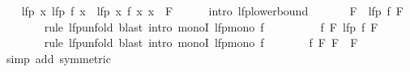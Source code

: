 \begin{isabellebody}
\ \ \isamarkupfalse%
\ {\isachardoublequoteopen}lfp\ {\isacharparenleft}{\kern0pt}{\isasymlambda}x{\isachardot}{\kern0pt}\ lfp\ {\isacharparenleft}{\kern0pt}f\ x{\isacharparenright}{\kern0pt}{\isacharparenright}{\kern0pt}\ {\isasymge}\ lfp\ {\isacharparenleft}{\kern0pt}{\isasymlambda}x{\isachardot}{\kern0pt}\ f\ x\ x{\isacharparenright}{\kern0pt}{\isachardoublequoteclose}\ {\isacharparenleft}{\kern0pt}\ {\isachardoublequoteopen}{\isacharquery}{\kern0pt}F\ {\isasymge}\ {\isacharunderscore}{\kern0pt}{\isachardoublequoteclose}{\isacharparenright}{\kern0pt}\isanewline
\ \ \isamarkupfalse%
\ {\isacharparenleft}{\kern0pt}intro\ lfp{\isacharunderscore}{\kern0pt}lowerbound{\isacharparenright}{\kern0pt}\isanewline
\ \ \ \ \isamarkupfalse%
\ {\isacharasterisk}{\kern0pt}{\isacharcolon}{\kern0pt}\ {\isachardoublequoteopen}{\isacharquery}{\kern0pt}F\ {\isacharequal}{\kern0pt}\ lfp\ {\isacharparenleft}{\kern0pt}f\ {\isacharquery}{\kern0pt}F{\isacharparenright}{\kern0pt}{\isachardoublequoteclose}\isanewline
\ \ \ \ \ \ \isamarkupfalse%
\ {\isacharparenleft}{\kern0pt}rule\ lfp{\isacharunderscore}{\kern0pt}unfold{\isacharparenright}{\kern0pt}\ {\isacharparenleft}{\kern0pt}blast\ intro{\isacharcolon}{\kern0pt}\ monoI\ lfp{\isacharunderscore}{\kern0pt}mono\ f{\isacharparenright}{\kern0pt}\isanewline
\ \ \ \ \isamarkupfalse%
\ \isamarkupfalse%
\ {\isachardoublequoteopen}{\isasymdots}\ {\isacharequal}{\kern0pt}\ f\ {\isacharquery}{\kern0pt}F\ {\isacharparenleft}{\kern0pt}lfp\ {\isacharparenleft}{\kern0pt}f\ {\isacharquery}{\kern0pt}F{\isacharparenright}{\kern0pt}{\isacharparenright}{\kern0pt}{\isachardoublequoteclose}\isanewline
\ \ \ \ \ \ \isamarkupfalse%
\ {\isacharparenleft}{\kern0pt}rule\ lfp{\isacharunderscore}{\kern0pt}unfold{\isacharparenright}{\kern0pt}\ {\isacharparenleft}{\kern0pt}blast\ intro{\isacharcolon}{\kern0pt}\ monoI\ lfp{\isacharunderscore}{\kern0pt}mono\ f{\isacharparenright}{\kern0pt}\isanewline
\ \ \ \ \isamarkupfalse%
\ \isamarkupfalse%
\ {\isachardoublequoteopen}f\ {\isacharquery}{\kern0pt}F\ {\isacharquery}{\kern0pt}F\ {\isasymle}\ {\isacharquery}{\kern0pt}F{\isachardoublequoteclose}\isanewline
\ \ \ \ \ \ \isamarkupfalse%
\ {\isacharparenleft}{\kern0pt}simp\ add{\isacharcolon}{\kern0pt}\ {\isacharasterisk}{\kern0pt}{\isacharbrackleft}{\kern0pt}symmetric{\isacharbrackright}{\kern0pt}{\isacharparenright}{\kern0pt}\isanewline
\ \ \isamarkupfalse%
\isanewline

\end{isabellebody}
